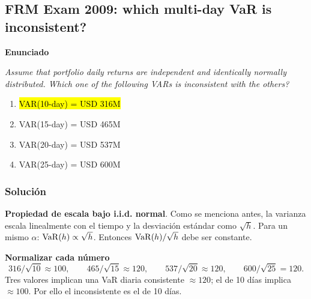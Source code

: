 ﻿\subsection{FRM Exam 2009: which multi-day VaR is inconsistent?}

\textbf{Enunciado}

\emph{Assume that portfolio daily returns are independent and identically normally distributed. Which one of the following VARs is inconsistent with the others?}
\begin{enumerate}[label=\alph*.]
\item \hl{VAR(10-day) = USD 316M}
\item VAR(15-day) = USD 465M
\item VAR(20-day) = USD 537M
\item VAR(25-day) = USD 600M
\end{enumerate}

\subsubsection*{Solución}


\textbf{Propiedad de escala bajo i.i.d. normal}. Como se menciona antes, la varianza escala linealmente con el tiempo y la desviación estándar como \(\sqrt{h}\). Para un mismo \(\alpha\): \(\mathrm{VaR}(h)\propto \sqrt{h}\). Entonces \(\mathrm{VaR}(h)/\sqrt{h}\) debe ser constante.

\textbf{Normalizar cada número}\\
\[
316/\sqrt{10}\approx 100,\qquad
465/\sqrt{15}\approx 120,\qquad
537/\sqrt{20}\approx 120,\qquad
600/\sqrt{25}=120.
\]
Tres valores implican una VaR diaria consistente \(\approx 120\); el de 10 días implica \(\approx 100\). Por ello el inconsistente es el de 10 días.

